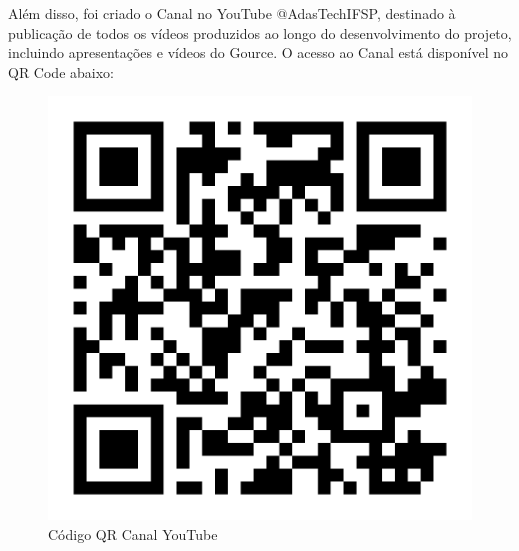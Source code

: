 Além disso, foi criado o Canal no YouTube @AdasTechIFSP, destinado à publicação de todos os vídeos produzidos ao longo do desenvolvimento do projeto, incluindo apresentações e vídeos do Gource. O acesso ao Canal está disponível no QR Code abaixo:

\begin{figure}[ht]
        \centering
        \includegraphics[scale=0.5]{qrCode-yotube.png}
        \caption{Código QR Canal YouTube}
        \label{fig:enter-label}
    \end{figure}